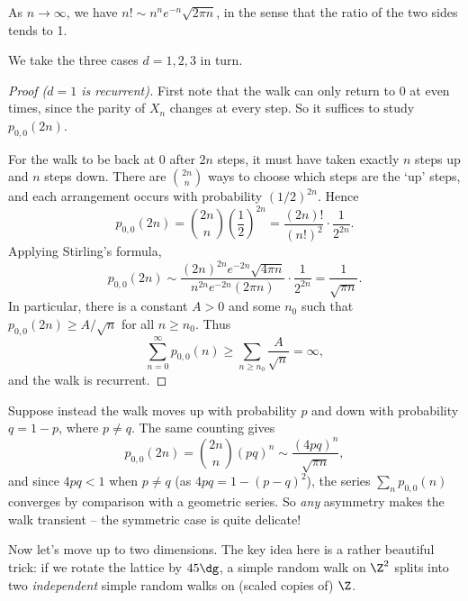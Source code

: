 \documentclass[a4paper]{scrartcl}
\begin{document}
\begin{fact}
	As $n \rightarrow \infty$, we have $n! \sim n^n e^{-n} \sqrt{2 \pi n}$, in the sense that the ratio of the two sides tends to 1.
\end{fact}

We take the three cases $d = 1, 2, 3$ in turn.

\begin{proof}[Proof ($d = 1$ is recurrent)]
	First note that the walk can only return to 0 at even times, since the parity of $X_n$ changes at every step. So it suffices to study $p_{0, 0}(2n)$.

	For the walk to be back at 0 after $2n$ steps, it must have taken exactly $n$ steps up and $n$ steps down. There are $\binom{2n}{n}$ ways to choose which steps are the `up' steps, and each arrangement occurs with probability $(1/2)^{2n}$. Hence
	$$
	p_{0, 0}(2n) = \binom{2n}{n} \left(\frac{1}{2}\right)^{2n} = \frac{(2n)!}{(n!)^2} \cdot \frac{1}{2^{2n}}.
	$$
	Applying Stirling's formula,
	$$
	p_{0, 0}(2n) \sim \frac{(2n)^{2n} e^{-2n}\sqrt{4 \pi n}}{n^{2n} e^{-2n} (2 \pi n)} \cdot \frac{1}{2^{2n}} = \frac{1}{\sqrt{\pi n}}.
	$$
	In particular, there is a constant $A > 0$ and some $n_0$ such that $p_{0, 0}(2n) \geq A/\sqrt{n}$ for all $n \geq n_0$. Thus
	$$
	\sum_{n = 0}^{\infty} p_{0, 0}(n) \geq \sum_{n \geq n_0} \frac{A}{\sqrt{n}} = \infty,
	$$
	and the walk is recurrent.
\end{proof}

\begin{remark}
	Suppose instead the walk moves up with probability $p$ and down with probability $q = 1 - p$, where $p \neq q$. The same counting gives
	$$
	p_{0, 0}(2n) = \binom{2n}{n} (pq)^n \sim \frac{(4pq)^n}{\sqrt{\pi n}},
	$$
	and since $4pq < 1$ when $p \neq q$ (as $4pq = 1 - (p - q)^2$), the series $\sum_n p_{0,0}(n)$ converges by comparison with a geometric series. So \emph{any} asymmetry makes the walk transient -- the symmetric case is quite delicate!
\end{remark}

Now let's move up to two dimensions. The key idea here is a rather beautiful trick: if we rotate the lattice by $45\dg$, a simple random walk on $\Z^2$ splits into two \emph{independent} simple random walks on (scaled copies of) $\Z$.
\end{document}
